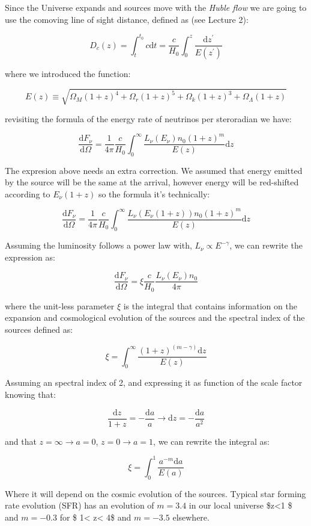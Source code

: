 \documentclass[
  letterpaper,
  DIV=11,
  numbers=noendperiod]{scrreprt}
\begin{document}
Since the Universe expands and sources move with the \emph{Huble flow}
we are going to use the comoving line of sight distance, defined as (see
Lecture 2):

\[D_c(z) = \int_{t}^{t_0} c\mathrm{ d} t = \frac{c}{H_0} \int^z_0 \frac{\mathrm{ d}z^\prime}{E(z^\prime)}\]

where we introduced the function:

\[E(z)\equiv \sqrt{\Omega_M(1+z)^4 + \Omega_r(1+z)^5 + \Omega_k(1+z)^3 +\Omega_\Lambda(1+z)}\]

revisiting the formula of the energy rate of neutrinos per steroradian
we have:

\[\frac{\mathrm{ d} F_\nu}{\mathrm{ d}\Omega} = \frac{1}{4\pi} \frac{c}{H_0}\int_0^{\infty} \frac{L_\nu(E_\nu) n_0(1+z)^m}{E(z)} \mathrm{ d}z\]

The expresion above needs an extra correction. We assumed that energy
emitted by the source will be the same at the arrival, however energy
will be red-shifted according to \(E_\nu (1 + z)\) so the formula it's
technically:

\[\frac{\mathrm{ d} F_\nu}{\mathrm{ d}\Omega} = \frac{1}{4\pi} \frac{c}{H_0}\int_0^{\infty} \frac{L_\nu(E_\nu(1+z)) n_0(1+z)^m}{E(z)} \mathrm{ d}z\]

Assuming the luminosity follows a power law with,
\(L_\nu \propto E^{-\gamma}\), we can rewrite the expression as:

\[\frac{\mathrm{ d} F_\nu}{\mathrm{ d}\Omega} = \xi \frac{c}{H_0} \frac{L_\nu(E_\nu) n_0}{4\pi} \]

where the unit-less parameter \(\xi\) is the integral that contains
information on the expansion and cosmological evolution of the sources
and the spectral index of the sources defined as:

\[\xi = \int_0^{\infty}\frac{(1+z)^{(m - \gamma)}\mathrm{ d} z}{E(z)}\]

Assuming an spectral index of 2, and expressing it as function of the
scale factor knowing that:

\[\frac{\mathrm{ d}z}{1+z} = - \frac{\mathrm{ d}a}{a} \rightarrow \mathrm{ d}z = -\frac{\mathrm{ d}a}{a^2}\]

and that \(z = \infty \rightarrow a = 0\), \(z = 0 \rightarrow a = 1\),
we can rewrite the integral as:

\[\xi = \int_0^{1}\frac{a^{-m} \mathrm{ d} a}{E(a)}\]

Where it will depend on the cosmic evolution of the sources. Typical
star forming rate evolution (SFR) has an evolution of \(m = 3.4\) in our
local universe \$z\textless1 \$ and \(m=-0.3\) for \$ 1\textless{}
z\textless{} 4\$ and \(m=-3.5\) elsewhere.
\end{document}

